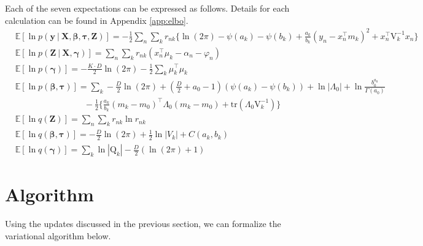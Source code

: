 \documentclass[twoside,11pt]{article}
\newcommand\given[1][]{\:#1\vert\:}
\newcommand{\transpose}[1]{#1^{\intercal}}
\newcommand{\nsum}{\sum_{n}}
\newcommand{\ksum}{\sum_{k}}
\newcommand{\boldbeta}{\boldsymbol\beta}
\newcommand{\boldgamma}{\boldsymbol\gamma}
\newcommand{\boldtau}{\boldsymbol\tau}
\newcommand{\E}{\mathbb{E}}
\newcommand{\pr}[1]{p \left( #1 \right)}
\begin{document}
Each of the seven expectations can be expressed as follows. Details for each calculation can be found in Appendix \ref{app:elbo}. 
\begin{align*}
	& \E[\ln\pr{\mathbf{y} \given \mathbf{X}, \boldbeta, \boldtau, \mathbf{Z}}] = -\frac{1}{2}\nsum \ksum r_{nk} \Big\{ \ln (2\pi) - \psi(a_k) - \psi(b_k)  + \frac{a_k}{b_k}(y_n - \transpose{x_n}m_k)^2 + \transpose{x_n}\mathrm{V}_k^{-1}x_n \Big\} \\
	 & \E[\ln \pr{\mathbf{Z} \given \mathbf{X}, \boldgamma}] = \nsum \ksum r_{nk} \left( \transpose{x_n}\mu_k - \alpha_n - \varphi_n \right) \\
	 & \E[\ln \pr{\boldgamma}] = - \frac{K \cdot D}{2} \ln (2\pi) - \frac{1}{2} \ksum \transpose{\mu_k}\mu_k \\
	 & \E[\ln \pr{\boldbeta, \boldtau}] = \ksum -\frac{D}{2}\ln(2\pi) + \left( \frac{D}{2} + a_0 - 1 \right) (\psi(a_k) - \psi(b_k)) + \ln |\Lambda_0| + \ln \frac{b_0^{a_0}}{\Gamma(a_0)} \\
	& \qquad \qquad \qquad \qquad  -\frac{1}{2} \Big\{ \frac{a_k}{b_k} \transpose{(m_k - m_0)} \Lambda_0 (m_k - m_0) + \mathrm{tr}\left( \Lambda_0 \mathrm{V}_k^{-1}\right)\Big\} \\
	& \E[\ln q(\mathbf{Z})] =  \nsum \ksum r_{nk} \ln r_{nk} \\
	& \E[\ln q(\boldbeta, \boldtau)] = -\frac{D}{2} \ln (2\pi) + \frac{1}{2} \ln |V_k| + C(a_k, b_k) \\
	& \E[\ln q(\boldgamma)] = \sum_{k} \ln|\mathrm{Q}_k| - \frac{D}{2}(\ln (2\pi) + 1)
\end{align*}


\newpage

\section{Algorithm}

Using the updates discussed in the previous section, we can formalize the variational algorithm below.
\end{document}
